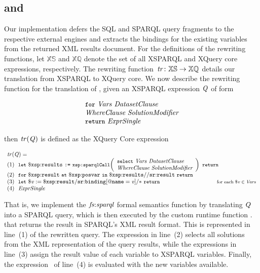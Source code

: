 \subsection{\SQLForClause and \SparqlForClause}
\label{sec:sparqlforclause-imple}
%
Our implementation defers the \ac{SQL} and SPARQL query fragments to the respective external engines and extracts the
bindings for the existing variables from the returned XML results document. 
%
For the definitions of the rewriting functions, let $\mathbb{XS}$ and $\mathbb{XQ}$ denote the set of all XSPARQL and
XQuery core expressions, respectively.  The rewriting function~$\mathit{tr} \colon \mathbb{XS} \to \mathbb{XQ}$
details our translation from XSPARQL to XQuery core.
%
We now describe the rewriting function for the translation of , given an XSPARQL expression
$\mathit{{Q}_{}}$ of form
%
\begin{queryF}
  \[
  \begin{array}{l}
    \texttt{{\small for}}~\mathit{Vars}~{\textit{Da\-ta\-set\-Clau\-se}}\\
    {\textit{Whe\-re\-Clause}}~{\textit{Solution\-Modifier}}\\
    \texttt{{\small return}}~{\textit{Expr\-Single}}
  \end{array}
  \]
\label{eq:expr_tr}
\end{queryF}%
%
\noindent
then $\mathit{tr}\!\left(\mathit{{Q}_{}}\right)$ is defined as the XQuery Core expression
%
\begin{small}
\begin{equation*}
  \begin{array}{l}
    \funcCall{tr}{\envElem{Q}{}} =  \\
    \mathrm{(1)~~}\LET~\varR{results}~\text{\texttt{:=}}~\funcCallR{sparqlCall}{\begin{array}{l}
        \SELECT~\Vars~\DatasetClause\\
        \SparqlWhereClause~\SolutionModifier
      \end{array}
    }~\RETURN\\
    \mathrm{(2)~~}\FOR~\varR{result}~\AT~\varR{posvar}~\IN~\varR{results//sr{:}result}~\RETURN \\
    \mathrm{(3)~~}\LET~\var{v} := \varR{result/sr{:}binding[@name = \varName{v}]/*}~\RETURN \hfill \qquad\qquad\qquad\qquad\qquad \textrm{\smaller for each~$\var{v} \in \Vars$}\\ 
    \mathrm{(4)~~}\grammarRule{ExprSingle} 
  \end{array}
\end{equation*}
\end{small}%
%
That is, we implement the $\mathit{fs{:}sparql}$ formal semantics function by translating $\mathit{{Q}_{}}$ into a
SPARQL \SELECT query, which is then executed by the custom runtime function .  that returns the
result in SPARQL's XML result format.  This is represented in line~(1) of the rewritten query.
%
The \FOR expression in line~(2) selects all solutions from the \ac{XML} representation of the query results, while the
\LET expressions in line~(3) assign the result value of each variable to XSPARQL variables.  Finally, the \RETURN
expression~ of line~(4) is evaluated with the new variables available.

